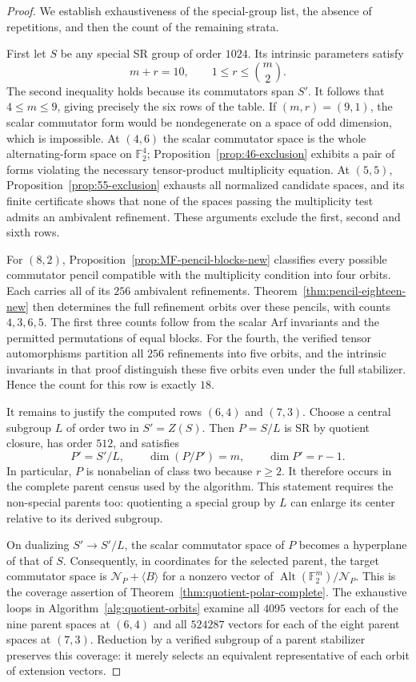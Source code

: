 \documentclass[11pt,a4paper]{amsart}
\theoremstyle{definition}
\theoremstyle{remark}
\DeclareMathOperator{\Alt}{Alt}
\numberwithin{equation}{section}
\begin{document}
\begin{proof}
We establish exhaustiveness of the special-group list, the absence
of repetitions, and then the count of the remaining strata.

First let $S$ be any special SR group of order $1024$. Its intrinsic
parameters satisfy
\[
 m+r=10,\qquad 1\le r\le\binom m2.
\]
The second inequality holds because its commutators span $S'$.
It follows that $4\le m\le9$, giving precisely the six rows of the
table. If $(m,r)=(9,1)$, the scalar commutator form would be
nondegenerate on a space of odd dimension, which is impossible.
At $(4,6)$ the scalar commutator space is the whole alternating-form
space on $\mathbb F_2^4$; Proposition~\ref{prop:46-exclusion}
exhibits a pair of forms violating the necessary tensor-product
multiplicity equation. At $(5,5)$,
Proposition~\ref{prop:55-exclusion} exhausts all normalized candidate
spaces, and its finite certificate shows that none of the spaces
passing the multiplicity test admits an ambivalent refinement.
These arguments exclude the first, second and sixth rows.

For $(8,2)$, Proposition~\ref{prop:MF-pencil-blocks-new} classifies
every possible commutator pencil compatible with the multiplicity
condition into four orbits. Each carries all of its $256$
ambivalent refinements. Theorem~\ref{thm:pencil-eighteen-new}
then determines the full refinement orbits over these pencils,
with counts $4,3,6,5$. The first three counts follow from the
scalar Arf invariants and the permitted permutations of equal
blocks. For the fourth, the verified tensor automorphisms partition
all $256$ refinements into five orbits, and the intrinsic invariants
in that proof distinguish these five orbits even under the full
stabilizer. Hence the count for this row is exactly $18$.

It remains to justify the computed rows $(6,4)$ and $(7,3)$.
Choose a central subgroup $L$ of order two in $S'=Z(S)$.
Then $P=S/L$ is SR by quotient closure, has order $512$, and
satisfies
\[
 P'=S'/L,\qquad \dim(P/P')=m,\qquad \dim P'=r-1.
\]
In particular, $P$ is nonabelian of class two because $r\ge2$.
It therefore occurs in the complete parent census used by the
algorithm. This statement requires the non-special parents too:
quotienting a special group by $L$ can enlarge its center relative
to its derived subgroup.

On dualizing $S'\to S'/L$, the scalar commutator space of $P$
becomes a hyperplane of that of $S$. Consequently, in coordinates
for the selected parent, the target commutator space is
$\mathcal N_P+\langle B\rangle$ for a nonzero vector of
$\Alt(\mathbb F_2^m)/\mathcal N_P$. This is the coverage assertion
of Theorem~\ref{thm:quotient-polar-complete}. The exhaustive loops
in Algorithm~\ref{alg:quotient-orbits} examine all $4095$ vectors
for each of the nine parent spaces at $(6,4)$ and all $524287$
vectors for each of the eight parent spaces at $(7,3)$.
Reduction by a verified subgroup of a parent stabilizer preserves
this coverage: it merely selects an equivalent representative of
each orbit of extension vectors.


\end{proof}
\end{document}
